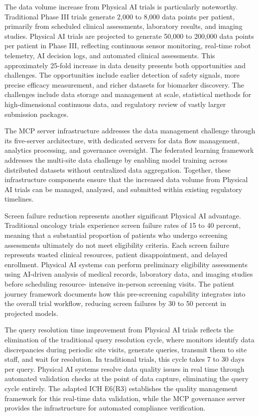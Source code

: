 The data volume increase from Physical AI trials is particularly noteworthy.
Traditional Phase III trials generate 2,000 to 8,000 data points per
patient, primarily from scheduled clinical assessments, laboratory results,
and imaging studies. Physical AI trials are projected to generate 50,000 to
200,000 data points per patient in Phase III, reflecting continuous sensor
monitoring, real-time robot telemetry, AI decision logs, and automated
clinical assessments. This approximately 25-fold increase in data density
presents both opportunities and challenges. The opportunities include
earlier detection of safety signals, more precise efficacy measurement, and
richer datasets for biomarker discovery. The challenges include data storage
and management at scale, statistical methods for high-dimensional continuous
data, and regulatory review of vastly larger submission packages.

The MCP server infrastructure \cite{national-mcp-paper} addresses the data
management challenge through its five-server architecture, with dedicated
servers for data flow management, analytics processing, and governance
oversight. The federated learning framework \cite{fl-paper} addresses the
multi-site data challenge by enabling model training across distributed
datasets without centralized data aggregation. Together, these
infrastructure components ensure that the increased data volume from
Physical AI trials can be managed, analyzed, and submitted within existing
regulatory timelines.

Screen failure reduction represents another significant Physical AI
advantage. Traditional oncology trials experience screen failure rates of
15 to 40 percent, meaning that a substantial proportion of patients who
undergo screening assessments ultimately do not meet eligibility criteria.
Each screen failure represents wasted clinical resources, patient
disappointment, and delayed enrollment. Physical AI systems can perform
preliminary eligibility assessments using AI-driven analysis of medical
records, laboratory data, and imaging studies before scheduling resource-
intensive in-person screening visits. The patient journey framework
\cite{patient-journey-paper} documents how this pre-screening capability
integrates into the overall trial workflow, reducing screen failures by
30 to 50 percent in projected models.

The query resolution time improvement from Physical AI trials reflects the
elimination of the traditional query resolution cycle, where monitors
identify data discrepancies during periodic site visits, generate queries,
transmit them to site staff, and wait for resolution. In traditional trials,
this cycle takes 7 to 30 days per query. Physical AI systems resolve data
quality issues in real time through automated validation checks at the
point of data capture, eliminating the query cycle entirely. The adapted
ICH E6(R3) \cite{ich-adapt} establishes the quality management framework
for this real-time data validation, while the MCP governance server
\cite{national-mcp-paper} provides the infrastructure for automated
compliance verification.

